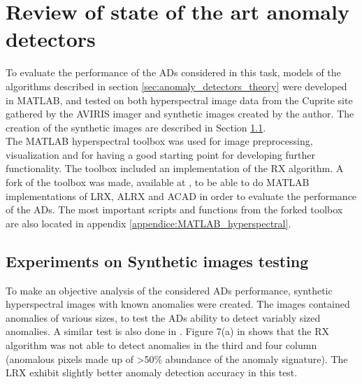 
\chapter{Review of state of the art anomaly detectors}
\label{chapter:review_anomaly_detectors}
To evaluate the performance of the ADs considered in this task, models of the algorithms described in section \ref{sec:anomaly_detectors_theory} were developed in MATLAB, and tested on both hyperspectral image data from the Cuprite site \cite{Cuprite_data} gathered by the AVIRIS imager and synthetic images created by the author. The creation of the synthetic images are described in Section \ref{sec:synthetic_images}.
\\

The MATLAB hyperspectral toolbox \cite{MATLAB_hyperspectral_toolbox} was used for image preprocessing, visualization and for having a good starting point for developing further functionality. The toolbox included an implementation of the RX algorithm. A fork of the toolbox was made, available at \cite{MATLAB_hyperspectral_toolbox_fork}, to be able to do MATLAB implementations of LRX, ALRX and ACAD in order to evaluate the performance of the ADs. The most important scripts and functions from the forked toolbox are also located in appendix \ref{appendice:MATLAB_hyperspectral}.
\section{Experiments on Synthetic images testing}
\label{sec:synthetic_images}
To make an objective analysis  of the considered ADs performance, synthetic hyperspectral images with known anomalies were created. The images contained anomalies of various sizes, to test the ADs ability to detect variably sized anomalies. A similar test is also done in \cite{global_and_local_rx}. Figure 7(a) in \cite{global_and_local_rx} shows that the RX algorithm was not able to detect anomalies in the third and four column (anomalous pixels made up of >50\% abundance of the anomaly signature). The LRX exhibit slightly better anomaly detection accuracy in this test.
\\


